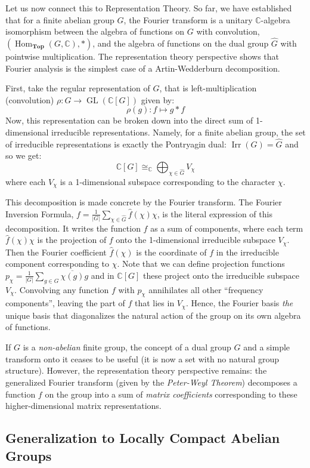 \documentclass{article}
\newcommand{\C}{{\mathbb{C}}}
\newcommand{\GL}{{\operatorname{GL}}}
\newcommand{\Top}{{\textbf{Top}}}
\newcommand{\Hom}{{\operatorname{Hom}}}
\newcommand{\Irr}{{\operatorname{Irr}}}
\begin{document}
Let us now connect this to Representation Theory. So far, we have established that for a finite abelian group
$G$, the Fourier transform is a unitary $\C$-algebra isomorphism between the algebra of functions on $G$ with
convolution, $(\Hom_\Top(G, \C), *)$, and the algebra of functions on the dual group $\hat{G}$ with pointwise
multiplication. The representation theory perspective shows that Fourier
analysis is the simplest case of a Artin-Wedderburn decomposition.

First, take the regular representation of $G$, that is left-multiplication (convolution) $\rho: G \to \GL(\C[G])$ given by:
\[
	\rho(g): f \mapsto g * f
\]
Now, this representation can be broken down into the direct sum of 1-dimensional
irreducible representations. Namely, for a finite abelian group, the set of irreducible representations is
exactly the Pontryagin dual: $\Irr(G) = \widehat{G}$ and so we get:
\[
	\C[G] \cong_\C \bigoplus_{\chi \in \widehat{G}} V_\chi
\]
where each $V_\chi$ is a 1-dimensional subspace corresponding to the character $\chi$.

This decomposition is made concrete by the Fourier transform. The Fourier Inversion Formula, $f =
\frac{1}{|G|} \sum_{\chi \in \hat{G}} \hat{f}(\chi)\chi$, is the literal expression of this decomposition. It
writes the function $f$ as a sum of components, where each term $\hat{f}(\chi)\chi$ is the projection of $f$
onto the 1-dimensional irreducible subspace $V_\chi$. Then the Fourier coefficient $\hat{f}(\chi)$ is the
coordinate of $f$ in the irreducible component corresponding to $\chi$. Note that we can define projection
functions $p_\chi = \frac{1}{|G|}\sum_{g \in G}\overline{\chi(g)}g$ and
 in $\C[G]$ these project onto the irreducible subspace $V_\chi$. Convolving any function $f$ with
$p_\chi$ annihilates all other ``frequency components'', leaving the part of $f$ that lies in $V_\chi$. Hence, the Fourier basis \emph{the} unique basis that diagonalizes the natural action of the group on its own algebra of functions.

If $G$ is a \emph{non-abelian} finite group, the concept of a dual group $\hat{G}$ and a simple transform
onto it ceases to be useful (it is now a set with no natural group structure). However, the representation
theory perspective remains: the generalized Fourier transform (given by the \emph{Peter-Weyl Theorem})
decomposes a function $f$ on the group into a sum of \emph{matrix coefficients} corresponding to these
higher-dimensional matrix representations.


\subsection{Generalization to Locally Compact Abelian Groups}
\label{sec:lcaGeneralization}
\end{document}
